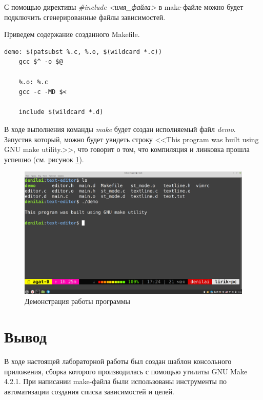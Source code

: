 \documentclass[a4paper,14pt]{extarticle}
\begin{document}
С помощью директивы \textit{\#include <имя\_файла>}  в make-файле можно будет подключить сгенерированные файлы зависимостей.

Приведем содержание созданного Makefile.

\begin{lstlisting}[caption={Makefile}]
	demo: $(patsubst %.c, %.o, $(wildcard *.c))
	gcc $^ -o $@
	
	%.o: %.c
	gcc -c -MD $<
	
	include $(wildcard *.d)
\end{lstlisting}

В ходе выполнения команды \textit{make} будет создан исполняемый файл \textit{demo}. Запустив который, можно будет увидеть строку <<This program was built using GNU make utility.>>, что говорит о том, что компиляция и линковка прошла успешно (см. рисунок \ref{fig:demo}).

\begin{figure}[h!]
	\centering
	\includegraphics[width=0.75\linewidth]{images/4/demo}
	\caption{Демонстрация работы программы}
	\label{fig:demo}
\end{figure}



\section*{Вывод}

В ходе настоящей лабораторной работы был создан шаблон консольного приложения, сборка которого производилась с помощью утилиты GNU Make 4.2.1. При написании make-файла были использованы инструменты по автоматизации создания списка зависимостей и целей.
\end{document}
